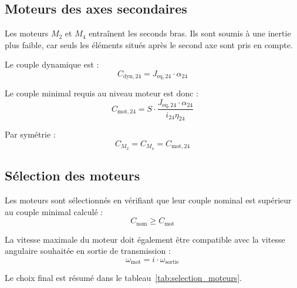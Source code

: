 \subsection{Moteurs des axes secondaires}

Les moteurs $M_2$ et $M_4$ entraînent les seconds bras. Ils sont soumis à une
inertie plus faible, car seuls les éléments situés après le second axe sont pris
en compte.

Le couple dynamique est :
\begin{equation}
    C_{\mathrm{dyn},24} = J_{\mathrm{eq},24} \cdot \alpha_{24}
\end{equation}

Le couple minimal requis au niveau moteur est donc :
\begin{equation}
    C_{\mathrm{mot},24} =
    S \cdot \frac{J_{\mathrm{eq},24} \cdot \alpha_{24}}{i_{24}\eta_{24}}
\end{equation}

Par symétrie :
\begin{equation}
    C_{M_2} = C_{M_4} = C_{\mathrm{mot},24}
\end{equation}
\subsection{Sélection des moteurs}

Les moteurs sont sélectionnés en vérifiant que leur couple nominal est supérieur
au couple minimal calculé :
\begin{equation}
    C_{\mathrm{nom}} \geq C_{\mathrm{mot}}
\end{equation}

La vitesse maximale du moteur doit également être compatible avec la vitesse
angulaire souhaitée en sortie de transmission :
\begin{equation}
    \omega_{\mathrm{mot}} = i \cdot \omega_{\mathrm{sortie}}
\end{equation}

Le choix final est résumé dans le tableau~\ref{tab:selection_moteurs}.
